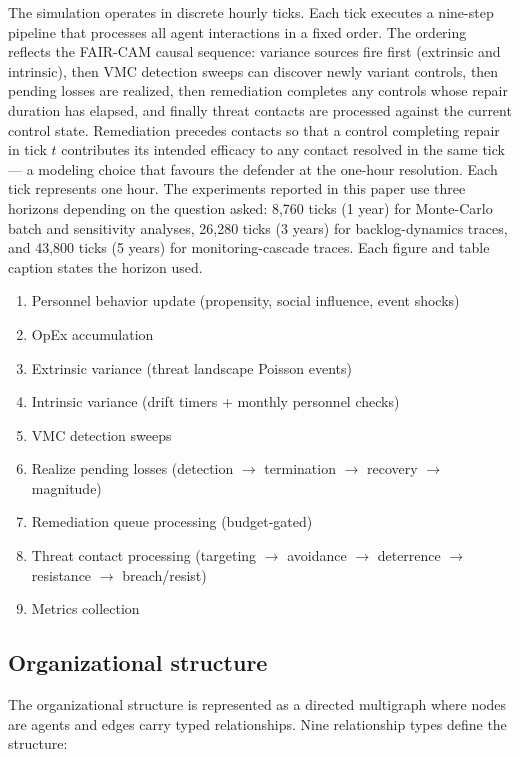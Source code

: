 \documentclass[11pt,a4paper]{article}
\begin{document}
The simulation operates in discrete hourly ticks. Each tick executes a nine-step pipeline that processes all agent interactions in a fixed order. The ordering reflects the FAIR-CAM causal sequence: variance sources fire first (extrinsic and intrinsic), then VMC detection sweeps can discover newly variant controls, then pending losses are realized, then remediation completes any controls whose repair duration has elapsed, and finally threat contacts are processed against the current control state. Remediation precedes contacts so that a control completing repair in tick $t$ contributes its intended efficacy to any contact resolved in the same tick --- a modeling choice that favours the defender at the one-hour resolution. Each tick represents one hour. The experiments reported in this paper use three horizons depending on the question asked: 8,760 ticks (1 year) for Monte-Carlo batch and sensitivity analyses, 26,280 ticks (3 years) for backlog-dynamics traces, and 43,800 ticks (5 years) for monitoring-cascade traces. Each figure and table caption states the horizon used.

\begin{enumerate}[nosep]
    \item Personnel behavior update (propensity, social influence, event shocks)
    \item OpEx accumulation
    \item Extrinsic variance (threat landscape Poisson events)
    \item Intrinsic variance (drift timers + monthly personnel checks)
    \item VMC detection sweeps
    \item Realize pending losses (detection $\to$ termination $\to$ recovery $\to$ magnitude)
    \item Remediation queue processing (budget-gated)
    \item Threat contact processing (targeting $\to$ avoidance $\to$ deterrence $\to$ resistance $\to$ breach/\allowbreak resist)
    \item Metrics collection
\end{enumerate}

\subsection{Organizational structure}

The organizational structure is represented as a directed multigraph where nodes are agents and edges carry typed relationships. Nine relationship types define the structure:
\end{document}
